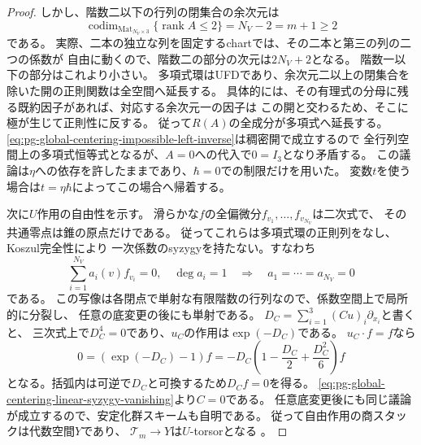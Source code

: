 \begin{proof}
しかし、階数二以下の行列の閉集合の余次元は
\begin{equation}
 \operatorname{codim}_{\operatorname{Mat}_{N_V\times3}}
       \{\operatorname{rank}A\le2\}=N_V-2=m+1\ge2
 \label{eq:pg-global-centering-rank-boundary-codimension}
\end{equation}
である。
実際、二本の独立な列を固定するchartでは、その二本と第三の列の二つの係数が
自由に動くので、階数二の部分の次元は$2N_V+2$となる。
階数一以下の部分はこれより小さい。
多項式環はUFDであり、余次元二以上の閉集合を除いた開の正則関数は全空間へ延長する。
具体的には、その有理式の分母に残る既約因子があれば、対応する余次元一の因子は
この開と交わるため、そこに極が生じて正則性に反する。
従って$R(A)$の全成分が多項式へ延長する。
\eqref{eq:pg-global-centering-impossible-left-inverse}は稠密開で成立するので
全行列空間上の多項式恒等式となるが、$A=0$への代入で$0=I_3$となり矛盾する。
この議論は$\eta$への依存を許したままであり、$\hbar=0$での制限だけを用いた。
変数$t$を使う場合は$t=\eta\hbar$によってこの場合へ帰着する。

次に$U$作用の自由性を示す。
滑らかな$f$の全偏微分$f_{v_1},\ldots,f_{v_{N_V}}$は二次式で、
その共通零点は錐の原点だけである。
従ってこれらは多項式環の正則列をなし、Koszul完全性により
一次係数のsyzygyを持たない。すなわち
\begin{equation}
 \sum_{i=1}^{N_V} a_i(v)f_{v_i}=0,\quad \deg a_i=1
 \quad\Longrightarrow\quad a_1=\cdots=a_{N_V}=0
 \label{eq:pg-global-centering-linear-syzygy-vanishing}
\end{equation}
である。
この写像は各閉点で単射な有限階数の行列なので、係数空間上で局所的に分裂し、
任意の底変更の後にも単射である。
$D_C=\sum_{i=1}^3(Cu)_i\partial_{x_i}$と書くと、
三次式上で$D_C^4=0$であり、$u_C$の作用は$\exp(-D_C)$である。
$u_C\cdot f=f$なら
\begin{equation}
 0=(\exp(-D_C)-1)f
   =-D_C\left(1-\frac{D_C}{2}+\frac{D_C^2}{6}\right)f
 \label{eq:pg-global-centering-nilpotent-stabilizer}
\end{equation}
となる。括弧内は可逆で$D_C$と可換するため$D_Cf=0$を得る。
\eqref{eq:pg-global-centering-linear-syzygy-vanishing}より$C=0$である。
任意底変更後にも同じ議論が成立するので、安定化群スキームも自明である。
従って自由作用の商スタックは代数空間$Y$であり、
$\mathcal T_m\to Y$は$U$-torsorとなる
\cite[Lemma~80.11.7, Tag~\texttt{06PH}]{PStacks}。


\end{proof}
